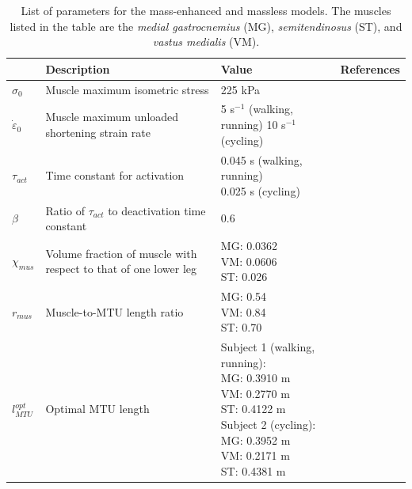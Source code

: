 \documentclass{sfuthesis}
\numberwithin{equation}{chapter}
\numberwithin{figure}{chapter}
\numberwithin{table}{chapter}
\theoremstyle{definition}
\newcommand{\depsilon}{\dot{\varepsilon}}
\begin{document}
\begin{table}
    \centering
    \begin{tabular}{|lp{5cm}|l|l|}\hline
         & Description & Value & References \\\hline
        $\sigma_0$ & Muscle maximum isometric stress & 225 kPa & \cite{Medler2002, Powell1984}\\\hline
        $\depsilon_0$ & Muscle maximum unloaded shortening strain rate & \makecell[l]{5 s$^{-1}$ (walking, running) \\ 10 s$^{-1}$ (cycling)} & \cite{WakeingLee2012} \\\hline
        $\tau_{act}$ & Time constant for activation & \makecell[l]{0.045 s (walking, running) \\ 0.025 s (cycling)} & \cite{Dick2017} \\\hline
        $\beta$ & Ratio of $\tau_{act}$ to deactivation time constant & 0.6 &\cite{Dick2017} \\\hline
        $\chi_{mus}$ & Volume fraction of muscle with respect to that of one lower leg & \makecell[l]{MG: 0.0362 \\ VM: 0.0606 \\ ST: 0.026} & \cite{Hansfield2014} \\\hline
        $r_{mus}$ & Muscle-to-MTU length ratio & \makecell[l]{MG: 0.54 \\ VM: 0.84 \\ ST: 0.70 } & \cite{Kovacz2020,OBrien2010}\\\hline
        $l_{MTU}^{opt}$ & Optimal MTU length & \makecell[l]{Subject 1 (walking, running):\\ \hspace{1em} MG: 0.3910 m \\ \hspace{1em} VM: 0.2770 m \\ \hspace{1em} ST: 0.4122 m \\ Subject 2 (cycling):\\ \hspace{1em} MG: 0.3952 m \\ \hspace{1em} VM: 0.2171 m \\ \hspace{1em} ST: 0.4381 m} & \cite{EvanThesis} \\\hline
    \end{tabular}
    \caption{List of parameters for the mass-enhanced and massless models. The muscles listed in the table are the \textit{medial gastrocnemius} (MG), \textit{semitendinosus} (ST), and \textit{vastus medialis} (VM).}
    \label{tab:1d-parameters}
\end{table}
\end{document}
